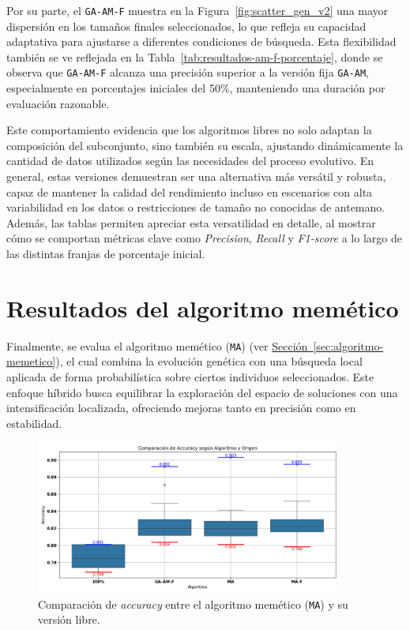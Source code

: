 Por su parte, el \texttt{GA-AM-F} muestra en la Figura~\ref{fig:scatter_gen_v2} una mayor dispersión en los tamaños finales seleccionados,
lo que refleja su capacidad adaptativa para ajustarse a diferentes condiciones de búsqueda.
Esta flexibilidad también se ve reflejada en la Tabla~\ref{tab:resultados-am-f-porcentaje},
donde se observa que \texttt{GA-AM-F} alcanza una precisión superior a la versión fija \texttt{GA-AM}, especialmente en porcentajes iniciales del 50\%,
manteniendo una duración por evaluación razonable.

Este comportamiento evidencia que los algoritmos libres no solo adaptan la composición del subconjunto, sino también su escala,
ajustando dinámicamente la cantidad de datos utilizados según las necesidades del proceso evolutivo.
En general, estas versiones demuestran ser una alternativa más versátil y robusta,
capaz de mantener la calidad del rendimiento incluso en escenarios con alta variabilidad en los datos o restricciones de tamaño no conocidas de antemano.
Además, las tablas permiten apreciar esta versatilidad en detalle, al mostrar cómo se comportan métricas clave como \textit{Precision},
\textit{Recall} y \textit{F1-score} a lo largo de las distintas franjas de porcentaje inicial.


\section{Resultados del algoritmo memético}\label{sec:resultados-algoritmo-memetico}
Finalmente, se evalua el algoritmo memético (\texttt{MA}) (ver \hyperref[sec:algoritmo-memetico]{Sección~\ref*{sec:algoritmo-memetico}}),
el cual combina la evolución genética con una búsqueda local aplicada de forma probabilística sobre ciertos individuos seleccionados.
Este enfoque híbrido busca equilibrar la exploración del espacio de soluciones con una intensificación localizada,
ofreciendo mejoras tanto en precisión como en estabilidad.


\begin{figure}[htp]
    \centering
    \includegraphics[width=0.9\textwidth]{imagenes/evaluaciones/comparacion-ma.png}
    \caption{Comparación de \textit{accuracy} entre el algoritmo memético (\texttt{MA}) y su versión libre.}
    \label{fig:memetico_comparacion}
\end{figure}

